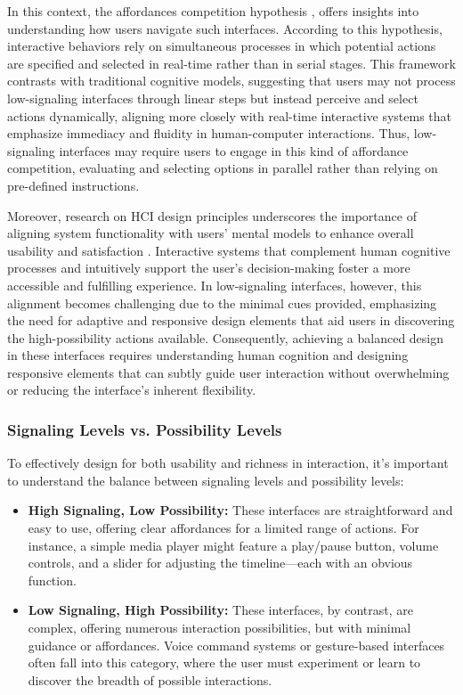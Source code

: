 In this context, the affordances competition hypothesis \cite{cisek2010neural}, offers insights into understanding how users navigate such interfaces.
According to this hypothesis, interactive behaviors rely on simultaneous processes in which potential actions are specified and selected in real-time rather than in serial stages.
This framework contrasts with traditional cognitive models, suggesting that users may not process low-signaling interfaces through linear steps but instead perceive and select actions dynamically, aligning more closely with real-time interactive systems that emphasize immediacy and fluidity in human-computer interactions.
Thus, low-signaling interfaces may require users to engage in this kind of affordance competition, evaluating and selecting options in parallel rather than relying on pre-defined instructions.

Moreover, research on HCI design principles underscores the importance of aligning system functionality with users' mental models to enhance overall usability and satisfaction \cite{10.1051/e3sconf/202339904037}.
Interactive systems that complement human cognitive processes and intuitively support the user's decision-making foster a more accessible and fulfilling experience.
In low-signaling interfaces, however, this alignment becomes challenging due to the minimal cues provided, emphasizing the need for adaptive and responsive design elements that aid users in discovering the high-possibility actions available.
Consequently, achieving a balanced design in these interfaces requires understanding human cognition and designing responsive elements that can subtly guide user interaction without overwhelming or reducing the interface’s inherent flexibility.

\subsubsection{ Signaling Levels vs. Possibility Levels}

To effectively design for both usability and richness in interaction, it's important to understand the balance between signaling levels and possibility levels:

\begin{itemize}
    \item \textbf{High Signaling, Low Possibility:} These interfaces are straightforward and easy to use, offering clear affordances for a limited range of actions. For instance, a simple media player might feature a play/pause button, volume controls, and a slider for adjusting the timeline—each with an obvious function.
    \item \textbf{Low Signaling, High Possibility:} These interfaces, by contrast, are complex, offering numerous interaction possibilities, but with minimal guidance or affordances. Voice command systems or gesture-based interfaces often fall into this category, where the user must experiment or learn to discover the breadth of possible interactions.
\end{itemize}
    



